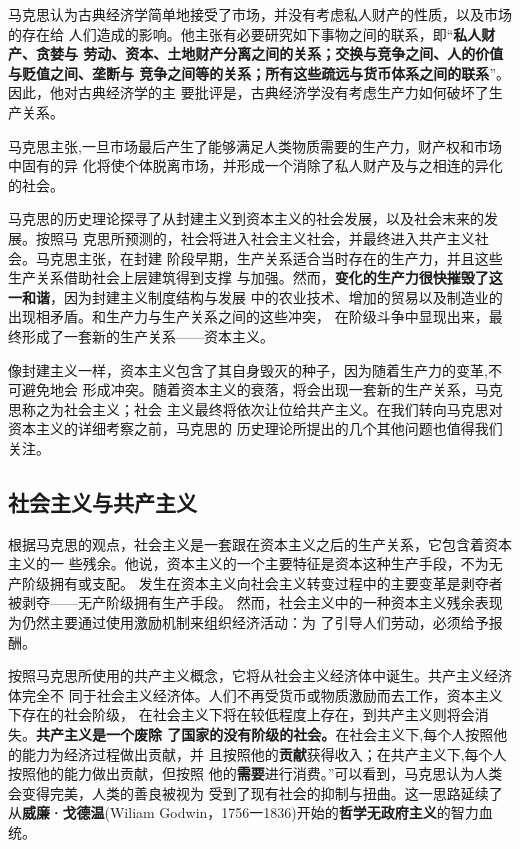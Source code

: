 马克思认为古典经济学简单地接受了市场，并没有考虑私人财产的性质，以及市场的存在给
人们造成的影响。他主张有必要研究如下事物之间的联系，即“\textbf{私人财产、贪婪与
  劳动、资本、土地财产分离之间的关系；交换与竞争之间、人的价值与贬值之间、垄断与
  竞争之间等的关系；所有这些疏远与货币体系之间的联系}”。因此，他对古典经济学的主
要批评是，古典经济学没有考虑生产力如何破坏了生产关系。

马克思主张,一旦市场最后产生了能够满足人类物质需要的生产力，财产权和市场中固有的异
化将使个体脱离市场，并形成一个消除了私人财产及与之相连的异化的社会。

马克思的历史理论探寻了从封建主义到资本主义的社会发展，以及社会末来的发展。按照马
克思所预测的，社会将进入社会主义社会，并最终进入共产主义社会。马克思主张，在封建
阶段早期，生产关系适合当时存在的生产力，并且这些生产关系借助社会上层建筑得到支撑
与加强。然而，\textbf{变化的生产力很快摧毁了这一和谐}，因为封建主义制度结构与发展
中的农业技术、增加的贸易以及制造业的出现相矛盾。和生产力与生产关系之间的这些冲突，
在阶级斗争中显现出来，最终形成了一套新的生产关系——资本主义。

像封建主义一样，资本主义包含了其自身毁灭的种子，因为随着生产力的变革,不可避免地会
形成冲突。随着资本主义的衰落，将会出现一套新的生产关系，马克思称之为社会主义；社会
主义最终将依次让位给共产主义。在我们转向马克思对资本主义的详细考察之前，马克思的
历史理论所提出的几个其他问题也值得我们关注。

\subsection{社会主义与共产主义}

根据马克思的观点，社会主义是一套跟在资本主义之后的生产关系，它包含着资本主义的一
些残余。他说，资本主义的一个主要特征是资本这种生产手段，不为无产阶级拥有或支配。
发生在资本主义向社会主义转变过程中的主要变革是剥夺者被剥夺——无产阶级拥有生产手段。
然而，社会主义中的一种资本主义残余表现为仍然主要通过使用激励机制来组织经济活动：为
了引导人们劳动，必须给予报酬。

按照马克思所使用的共产主义概念，它将从社会主义经济体中诞生。共产主义经济体完全不
同于社会主义经济体。人们不再受货币或物质激励而去工作，资本主义下存在的社会阶级，
在社会主义下将在较低程度上存在，到共产主义则将会消失。\textbf{共产主义是一个废除
  了国家的没有阶级的社会。}在社会主义下,每个人按照他的能力为经济过程做出贡献，并
且按照他的\textbf{贡献}获得收入；在共产主义下,每个人按照他的能力做出贡献，但按照
他的\textbf{需要}进行消费。”可以看到，马克思认为人类会变得完美，人类的善良被视为
受到了现有社会的抑制与扭曲。这一思路延续了从\textbf{威廉·戈德温}(Wiliam
Godwin，1756一1836)开始的\textbf{哲学无政府主义}的智力血统。

